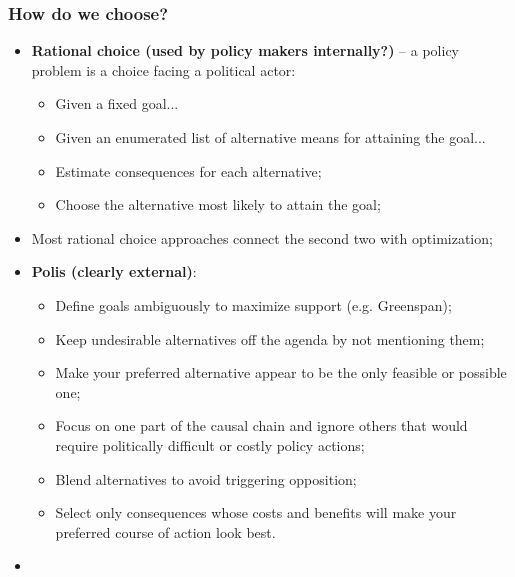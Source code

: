 \documentclass[aspectratio=169]{beamer}
\theoremstyle{principle}
\begin{document}
\begin{frame}
\frametitle{How do we choose?}
\begin{itemize}
\item \textbf{Rational choice (used by policy makers internally?)} -- a policy problem is a choice facing a political actor:
\begin{itemize}
\item Given a fixed goal...
\item Given an enumerated list of alternative means for attaining the goal...
\item Estimate consequences for each alternative;
\item Choose the alternative most likely to attain the goal;
\end{itemize}
\bigskip
\item Most rational choice approaches connect the second two with optimization;
\bigskip
\item \textbf{Polis (clearly external)}:
\begin{itemize}
\item Define goals ambiguously to maximize support (e.g. Greenspan);
\item Keep undesirable alternatives off the agenda by not mentioning them;
\item Make your preferred alternative appear to be the only feasible or possible one;
\item Focus on one part of the causal chain and ignore others that would require politically difficult or costly policy actions;
\item Blend alternatives to avoid triggering opposition;
\item Select only consequences whose costs and benefits will make your preferred course of action look best.
\end{itemize}
\bigskip
\item
\end{itemize}
\end{frame}
\end{document}
